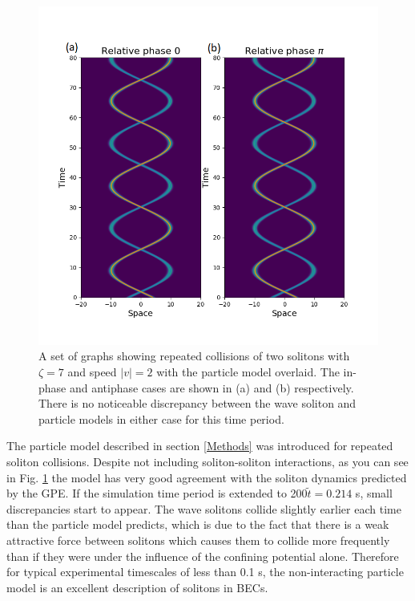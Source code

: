 \documentclass[10pt, twocolumn]{revtex4}    %
\begin{document}
\begin{figure}[h]
\includegraphics[width=\columnwidth]{repeated-particles.png}
\caption{A set of graphs showing repeated collisions of two solitons with $\zeta=7$ and speed $|v|=2$ with the particle model overlaid. The in-phase and antiphase cases are shown in (a) and (b) respectively. There is no noticeable discrepancy between the wave soliton and particle models in either case for this time period.}
\label{repeated-particles}
\end{figure}

The particle model described in section \ref{Methods} was introduced for repeated soliton collisions. Despite not including soliton-soliton interactions, as you can see in Fig. \ref{repeated-particles} the model has very good agreement with the soliton dynamics predicted by the GPE. If the simulation time period is extended to 200$\tilde{t} = 0.214$ s, small discrepancies start to appear. The wave solitons collide slightly earlier each time than the particle model predicts, which is due to the fact that there is a weak attractive force between solitons which causes them to collide more frequently than if they were under the influence of the confining potential alone. Therefore for typical experimental timescales of less than 0.1 s, the non-interacting particle model is an excellent description of solitons in BECs. 
\end{document}
